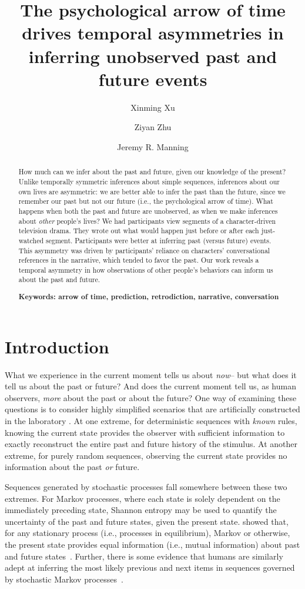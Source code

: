 \documentclass[10pt]{article}
\title{\Large The psychological arrow of time drives temporal asymmetries in inferring unobserved past and future events}
\author[1]{Xinming Xu}
\author[2]{Ziyan Zhu}
\author[1, $\star$]{Jeremy R. Manning}
\affil[1]{Dartmouth College, Hanover, NH, USA}
\affil[2]{Peking University, Beijing, China}
\affil[$\star$]{Address correspondence to jeremy.r.manning@dartmouth.edu}
\begin{document}
\maketitle

\begin{abstract} {
  How much can we infer about the past and future, given our knowledge of the present?  Unlike temporally symmetric inferences about simple sequences, inferences about our own lives are asymmetric: we are better able to infer the past than the future, since we remember our past but not our future (i.e., the psychological arrow of time).  What happens when both the past and future are unobserved, as when we make inferences about \textit{other} people's lives?  We had participants view segments of a character-driven television drama.  They wrote out what would happen just before or after each just-watched segment.  Participants were better at inferring past (versus future) events.  This asymmetry was driven by participants’ reliance on characters’ conversational references in the narrative, which tended to favor the past.  Our work reveals a temporal asymmetry in how observations of other people’s behaviors can inform us about the past and future.

\textbf{Keywords: arrow of time, prediction, retrodiction, narrative, conversation}}

\end{abstract}

\section*{Introduction}
What we experience in the current moment tells us about \textit{now}-- but what does it tell us about the past or future?  And does the current moment tell us, as human observers, \textit{more} about the past or about the future?  One way of examining these questions is to consider highly simplified scenarios that are artificially constructed in the laboratory \citep[e.g., ][]{MaheEtal22}.  At one extreme, for deterministic sequences with \textit{known} rules, knowing the current state provides the observer with sufficient information to exactly reconstruct the entire past and future history of the stimulus. At another extreme, for purely random sequences, observing the current state provides no information about the past \textit{or} future.

Sequences generated by stochastic processes fall somewhere between these two extremes. For Markov processes, where each state is solely dependent on the immediately preceding state, Shannon entropy may be used to quantify the uncertainty of the past and future states, given the present state. \cite{Cove94} showed that, for any stationary process (i.e., processes in equilibrium), Markov or otherwise, the present state provides equal information (i.e., mutual information) about past and future states~\citep[also see][]{BialEtal01, ElliEtal09}. Further, there is some evidence that humans are similarly adept at inferring the most likely previous and next items in sequences governed by stochastic Markov processes~\citep{JonePash07}.
\end{document}
